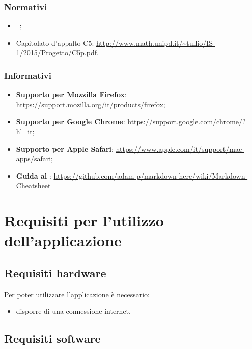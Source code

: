 \documentclass[12pt,a4paper]{article}
\begin{document}
\subsubsection{Normativi}
\begin{itemize}
	\item \NdPv\ ;
	\item Capitolato d'appalto C5: \url{http://www.math.unipd.it/~tullio/IS-1/2015/Progetto/C5p.pdf}.
\end{itemize}

\subsubsection{Informativi}
\begin{itemize}
	\item \textbf{Supporto per Mozzilla Firefox}: \url{https://support.mozilla.org/it/products/firefox};
	\item \textbf{Supporto per Google Chrome}: \url{https://support.google.com/chrome/?hl=it};
	\item \textbf{Supporto per Apple Safari}: \url{https://www.apple.com/it/support/mac-apps/safari};
	\item \textbf{Guida al }: \url{https://github.com/adam-p/markdown-here/wiki/Markdown-Cheatsheet}
\end{itemize}

	\newpage
	\section{Requisiti per l'utilizzo dell'applicazione} 
	\subsection{Requisiti hardware}
	Per poter utilizzare l'applicazione \prj{} è necessario:
	\begin{itemize}
		\item disporre di una connessione internet.
	\end{itemize}
	\subsection{Requisiti software}
	
\end{document}
